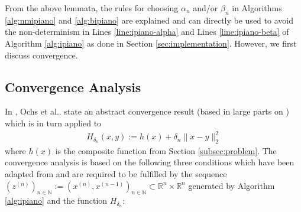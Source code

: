 \documentclass[onecolumn,final,a4paper,13pt,reqno]{siamart}
\makeatletter
\DeclareRobustCommand\onedot{\futurelet\@let@token\@onedot}
\def\@onedot{\ifx\@let@token.\else.\null\fi\xspace}
\def\etal{{et al}\onedot}
\makeatother
\begin{document}
From the above lemmata, the rules for choosing $\alpha_n$ and/or $\beta_n$ in Algorithms \ref{alg:nmipiano} and \ref{alg:bipiano} are explained and can directly be used to avoid the non-determinism in Lines \ref{line:ipiano-alpha} and Lines \ref{line:ipiano-beta} of Algorithm \ref{alg:ipiano} as done in Section \ref{sec:implementation}. However, we first discuss convergence.

\subsection{Convergence Analysis}
\label{ipiano:ipiano-analysis}

In \cite{OchsChenBroxPock:2013}, Ochs \etal state an abstract convergence result (based in large parts on \cite{AttouchBolteSvaiter:2013}) which is in turn applied to
\begin{align}
	H_{\delta_n}(x, y) := h(x) + \delta_n\|x - y\|_2^2\label{eq:H}
\end{align}
where $h(x)$ is the composite function from Section \ref{subsec:problem}. The convergence analysis is based on the following three conditions which have been adapted from \cite{AttouchBolteSvaiter:2013} and are required to be fulfilled by the sequence $(z^{(n)})_{n \in \mathbb{N}} := (x^{(n)}, x^{(n - 1)})_{n \in \mathbb{N}} \subset \mathbb{R}^{n} \times \mathbb{R}^n$ generated by Algorithm \ref{alg:ipiano} and the function $H_{\delta_n}$:
\end{document}

